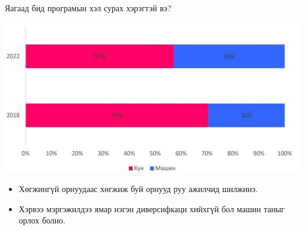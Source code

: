 \documentclass[
  ignorenonframetext,
]{beamer}
\begin{document}
\begin{frame}{Яагаад бид програмын хэл сурах хэрэгтэй вэ?}
\protect\hypertarget{ux44fux430ux433ux430ux430ux434-ux431ux438ux434-ux43fux440ux43eux433ux440ux430ux43cux44bux43d-ux445ux44dux43b-ux441ux443ux440ux430ux445-ux445ux44dux440ux44dux433ux442ux44dux439-ux432ux44d}{}

\includegraphics[width=500px]{Picture3}

\begin{itemize}
\item
  Хөгжингүй орнуудаас хөгжиж буй орнууд руу ажилчид шилжинэ.
\item
  Хэрвээ мэргэжилдээ ямар нэгэн диверсифкаци хийхгүй бол машин таныг
  орлох болно.
\end{itemize}

\end{frame}
\end{document}
